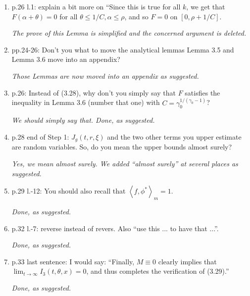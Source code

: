 \documentclass[12pt,a4paper]{amsart}
\numberwithin{equation}{section}
\theoremstyle{plain}
\theoremstyle{definition}
\begin{document}
\begin{enumerate}
  {\it We agree. 
    This doesn't compromise the later proofs.
    We emphasized this in the new version to avoid any confusions.}
\item
  p.26 l.1: explain a bit more on ``Since this is true for all $k$, we get that $F(\alpha+\theta) = 0$ for all $\theta \leq 1/C, \alpha \leq \rho$, and so $F = 0$ on $[0, \rho+1/C]$.
  
  {\it The prove of this Lemma is simplified and the concerned argument is deleted.}
\item
  pp.24-26: Don't you what to move the analytical lemmas Lemma 3.5 and Lemma 3.6 move into an appendix?
  
  {\it Those Lemmas are now moved into an appendix as suggested.}
\item
  p.26: Instead of (3.28), why don't you simply say that $F$ satisfies the inequality in Lemma 3.6 (number that one) with $C = \gamma_0^{1/(\gamma_0 - 1)}$?
  
  {\it We should simply say that. 
    Done, as suggested.}
\item
  p.28 end of Step 1: $J_g(t,r,\xi)$ and the two other terms you upper estimate are random variables.
  So, do you mean the upper bounds almost surely?
  
  {\it Yes, we mean almost surely. 
  We added ``almost surely'' at several places as suggested.}
\item
  p.29 l.-12: You should also recall that $\left\langle f, \phi^* \right\rangle_m = 1$.
  
  {\it Done, as suggested.}
\item
  p.32 l.-7: reverse instead of revers. 
  Also ``use this ... to have that ...''.

  {\it Done, as suggested.}
\item
  p.33 last sentence: I would say: ``Finally, $M \equiv 0$ clearly implies that $\lim_{t\to \infty} I_3(t,\theta,x) = 0$, and thus completes the verification of (3.29).''

  {\it Done, as suggested.}
\end{enumerate}


\end{document}
